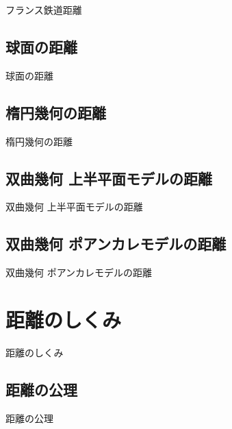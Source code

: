 フランス鉄道距離

\newpage


\subsection{球面の距離}

球面の距離

\newpage


\subsection{楕円幾何の距離}

楕円幾何の距離

\newpage


\subsection{双曲幾何 上半平面モデルの距離}

双曲幾何 上半平面モデルの距離

\newpage


\subsection{双曲幾何 ポアンカレモデルの距離}

双曲幾何 ポアンカレモデルの距離

\newpage


\section{距離のしくみ}

距離のしくみ

\newpage


\subsection{距離の公理}

距離の公理

